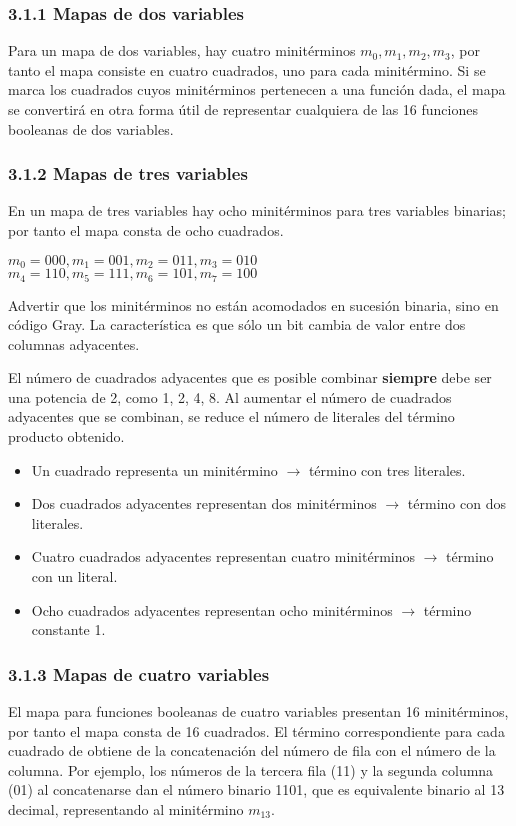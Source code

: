 \documentclass{article}
\begin{document}
\subsubsection*{3.1.1 Mapas de dos variables}
Para un mapa de dos variables, hay cuatro minit\'{e}rminos $m_0, m_1, m_2, m_3$, por tanto el mapa consiste en cuatro 
cuadrados, uno para cada minit\'{e}rmino. Si se marca los cuadrados cuyos minit\'{e}rminos pertenecen a una funci\'{o}n
dada, el mapa se convertir\'{a} en otra forma \'{u}til de representar cualquiera de las 16 funciones booleanas de dos
variables.

\subsubsection*{3.1.2 Mapas de tres variables}
En un mapa de tres variables hay ocho minit\'{e}rminos para tres variables binarias; por tanto el mapa consta de ocho
cuadrados. 
\begin{center}
    $m_0 = 000, m_1 = 001, m_2 = 011, m_3 = 010$ \\
    $m_4 = 110, m_5 = 111, m_6 = 101, m_7 = 100$
\end{center}
Advertir que los minit\'{e}rminos no est\'{a}n acomodados en sucesi\'{o}n binaria, sino en c\'{o}digo Gray.
La caracter\'{i}stica es que s\'{o}lo un bit cambia de valor entre dos columnas adyacentes.

El n\'{u}mero de cuadrados adyacentes que es posible combinar \textbf{siempre} debe ser una potencia de 2, como
1, 2, 4, 8. Al aumentar el n\'{u}mero de cuadrados adyacentes que se combinan, se reduce el n\'{u}mero de literales
del t\'{e}rmino producto obtenido.
\begin{itemize}
    \item Un cuadrado representa un minit\'{e}rmino $\rightarrow$ t\'{e}rmino con tres literales.
    \item Dos cuadrados adyacentes representan dos minit\'{e}rminos $\rightarrow$ t\'{e}rmino con dos literales. 
    \item Cuatro cuadrados adyacentes representan cuatro minit\'{e}rminos $\rightarrow$ t\'{e}rmino con un literal.
    \item Ocho cuadrados adyacentes representan ocho minit\'{e}rminos $\rightarrow$ t\'{e}rmino constante 1.
\end{itemize}

\subsubsection*{3.1.3 Mapas de cuatro variables}
El mapa para funciones booleanas de cuatro variables presentan 16 minit\'{e}rminos, por tanto 
el mapa consta de 16 cuadrados. El t\'{e}rmino correspondiente para cada cuadrado de obtiene de 
la concatenaci\'{o}n del n\'{u}mero de fila con el n\'{u}mero de la columna. Por ejemplo, 
los n\'{u}meros de la tercera fila (11) y la segunda columna (01) al concatenarse dan el 
n\'{u}mero binario 1101, que es equivalente binario al 13 decimal, representando al minit\'{e}rmino $m_{13}$.
\end{document}
